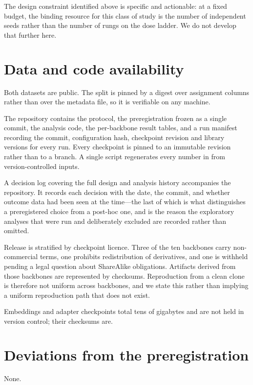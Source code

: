 \documentclass[11pt,a4paper]{article}
\begin{document}
The design constraint identified above is specific and actionable: at a fixed
budget, the binding resource for this class of study is the number of independent
seeds rather than the number of rungs on the dose ladder. We do not develop that
further here.

\section*{Data and code availability}

Both datasets are public. The split is pinned by a digest over assignment columns
rather than over the metadata file, so it is verifiable on any machine.

The repository contains the protocol, the preregistration frozen as a single
commit, the analysis code, the per-backbone result tables, and a run manifest
recording the commit, configuration hash, checkpoint revision and library
versions for every run. Every checkpoint is pinned to an immutable revision
rather than to a branch. A single script regenerates every number in
 from version-controlled inputs.

A decision log covering the full design and analysis history accompanies the
repository. It records each decision with the date, the commit, and whether
outcome data had been seen at the time---the last of which is what distinguishes
a preregistered choice from a post-hoc one, and is the reason the exploratory
analyses that were run and deliberately excluded are recorded rather than
omitted.

Release is stratified by checkpoint licence. Three of the ten backbones carry
non-commercial terms, one prohibits redistribution of derivatives, and one is
withheld pending a legal question about ShareAlike obligations. Artifacts derived
from those backbones are represented by checksums. Reproduction from a clean
clone is therefore not uniform across backbones, and we state this rather than
implying a uniform reproduction path that does not exist.

Embeddings and adapter checkpoints total tens of gigabytes and are not held in
version control; their checksums are.

\section*{Deviations from the preregistration}

None.



\end{document}
